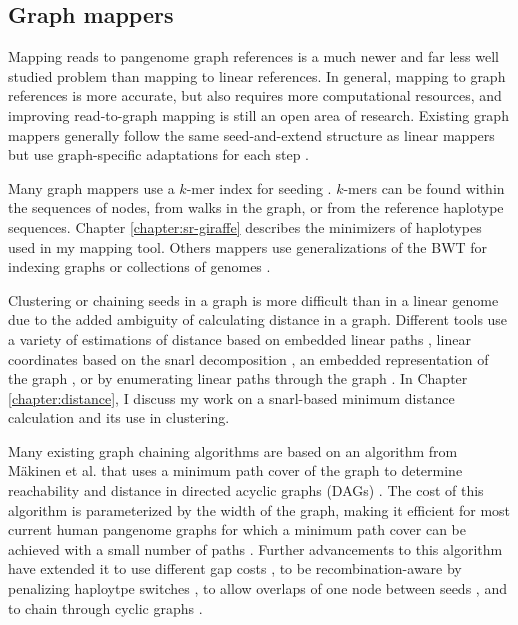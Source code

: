 \documentclass[11pt]{ucscthesis}
\begin{document}

\subsection{Graph mappers}
\label{sec:graph-mappers}

Mapping reads to pangenome graph references is a much newer and far less well studied problem than mapping to linear references.
In general, mapping to graph references is more accurate, but also requires more computational resources, and improving read-to-graph mapping is still an open area of research.
Existing graph mappers generally follow the same seed-and-extend structure as linear mappers but use graph-specific adaptations for each step \cite{eizenga_pangenome_2020, baaijens_computational_2022}.

Many graph mappers use a $k$-mer index for seeding \cite{rautiainen_graphaligner_2020,rakocevic_fast_2019,vaddadi_vmap_2019,schneeberger_simultaneous_2009}.
$k$-mers can be found within the sequences of nodes, from walks in the graph, or from the reference haplotype sequences. 
Chapter \ref{chapter:sr-giraffe} describes the minimizers of haplotypes used in my mapping tool.
Others mappers use generalizations of the BWT for indexing graphs \cite{garrison_vg_2018,kim_hisat2_2019,siren_indexing_2014,siren_indexes_2020} or collections of genomes \cite{rossi_moni_2022}.

Clustering or chaining seeds in a graph is more difficult than in a linear genome due to the added ambiguity of calculating distance in a graph.
Different tools use a variety of estimations of distance based on embedded linear paths \cite{garrison_vg_2018}, linear coordinates based on the snarl decomposition \cite{rautiainen_graphaligner_2020}, an embedded representation of the graph \cite{vaddadi_vmap_2019}, or by enumerating linear paths through the graph \cite{li_minigraph_2020}.
In Chapter \ref{chapter:distance}, I discuss my work on a snarl-based minimum distance calculation and its use in clustering. 

Many existing graph chaining algorithms are based on an algorithm from M{\"a}kinen et al. that uses a minimum path cover of the graph to determine reachability and distance in directed acyclic graphs (DAGs) \cite{makinen_dag_chaining_2019}.
The cost of this algorithm is parameterized by the width of the graph, making it efficient for most current human pangenome graphs for which a minimum path cover can be achieved with a small number of paths \cite{makinen_dag_chaining_2019}.
Further advancements to this algorithm have extended it to use different gap costs \cite{chandra_gap-sensitive_chaining_2023}, to be recombination-aware by penalizing haploytpe switches \cite{chandra_haplotype-aware_2024}, to allow overlaps of one node between seeds \cite{ma_graphchainer_2023}, and to chain through cyclic graphs \cite{panaligner_2024}.
\end{document}
